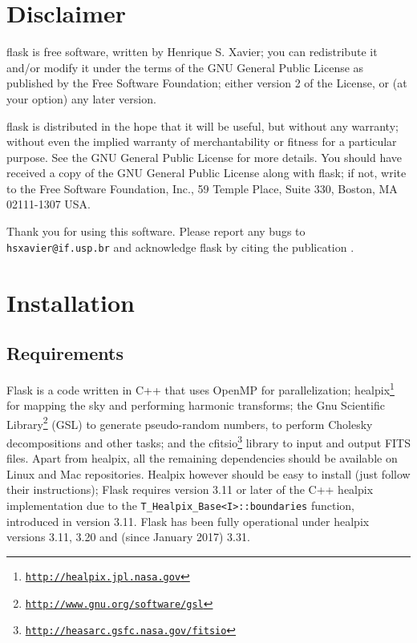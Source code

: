 \documentclass[12pt]{book} %
\begin{document}
\tableofcontents


\chapter{Disclaimer}
\label{sec:disclaimer}

   {\sc flask} is free software, written by Henrique S. Xavier; 
   you can redistribute it and/or modify it under the terms of the GNU 
   General Public License as published by the Free Software Foundation; 
   either version 2 of the License, or (at your option) any later version.

   {\sc flask} is distributed in the hope that it will be useful,
   but without any warranty; without even the implied warranty of
   merchantability or fitness for a particular purpose. See the
   GNU General Public License for more details. You should have received 
   a copy of the GNU General Public License along with {\sc flask}; if not, 
   write to the Free Software Foundation, Inc., 59 Temple Place, Suite 330, 
   Boston, MA  02111-1307  USA.

   Thank you for using this software. Please report any bugs to {\tt hsxavier@if.usp.br} and
   acknowledge {\sc flask} by citing the publication \citet{Xavier16mn}.
   

\chapter{Installation}
\label{sec:installation}

\section{Requirements}
\label{sec:requirements}

{\sc Flask} is a code written in {\sc C++} that uses {\sc OpenMP} for parallelization; 
{\sc healpix}\footnote{{\tt \href{http://healpix.jpl.nasa.gov}{http://healpix.jpl.nasa.gov}}} for 
mapping the sky and performing harmonic transforms; the Gnu Scientific 
Library\footnote{{\tt \href{http://www.gnu.org/software/gsl}{http://www.gnu.org/software/gsl}}} 
({\sc GSL}) to generate pseudo-random numbers, to perform Cholesky decompositions and other tasks; and the 
{\sc cfitsio}\footnote{{\tt \href{http://heasarc.gsfc.nasa.gov/fitsio}{http://heasarc.gsfc.nasa.gov/fitsio}}} 
library to input and output FITS files. Apart from {\sc healpix}, all the remaining dependencies should 
be available on Linux and Mac repositories. {\sc Healpix} however should be easy to install (just 
follow their instructions); {\sc Flask} requires version 3.11 or later of the C++ {\sc healpix} 
implementation due to the {\tt T\_Healpix\_Base<I>::boundaries} function, introduced in version 3.11. 
{\sc Flask} has been fully operational under {\sc healpix} versions 3.11, 3.20 and (since January 2017) 3.31.
\end{document}
